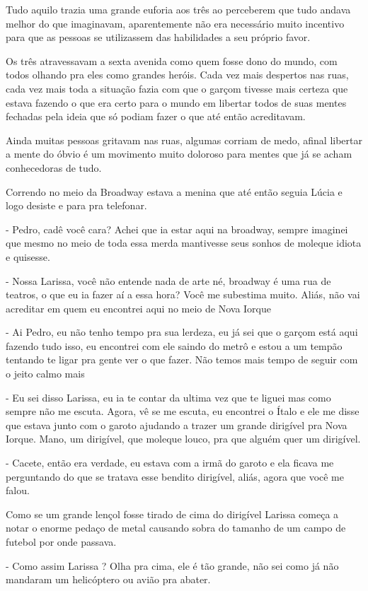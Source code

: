 Tudo aquilo trazia uma grande euforia aos três ao perceberem que tudo andava melhor do que imaginavam, aparentemente não era necessário muito incentivo para que as pessoas se utilizassem das habilidades a seu próprio favor.

Os três atravessavam a sexta avenida como quem fosse dono do mundo,  com todos olhando pra eles como grandes heróis. Cada vez mais despertos nas ruas, cada vez mais toda a situação fazia com que o garçom tivesse mais certeza que estava fazendo o que era certo para o mundo em libertar todos de suas mentes fechadas pela ideia que só podiam fazer o que até então acreditavam.

Ainda muitas pessoas gritavam nas ruas, algumas corriam de medo, afinal libertar a mente do óbvio é um movimento muito doloroso para mentes que já se acham conhecedoras de tudo.

Correndo no meio da Broadway estava a menina que até então seguia Lúcia e logo desiste e para pra telefonar.

- Pedro, cadê você cara? Achei que ia estar aqui na broadway, sempre imaginei que mesmo no meio de toda essa merda mantivesse seus sonhos de moleque idiota e quisesse.

- Nossa Larissa, você não entende nada de arte né, broadway é uma rua de teatros, o que eu ia fazer aí a essa hora? Você me subestima muito. Aliás, não vai acreditar em quem eu encontrei aqui no meio de Nova Iorque

- Ai Pedro, eu não tenho tempo pra sua lerdeza, eu já sei que o garçom está aqui fazendo tudo isso, eu encontrei com ele saindo do metrô e estou a um tempão tentando te ligar pra gente ver o que fazer.  Não temos mais tempo de seguir com o jeito calmo mais

- Eu sei disso Larissa, eu ia te contar da ultima vez que te liguei mas como sempre não me escuta. Agora, vê se me escuta, eu encontrei o Ítalo e ele me disse que estava junto com o garoto ajudando a trazer um grande dirigível pra Nova Iorque. Mano, um dirigível, que moleque louco, pra que alguém quer um dirigível.

- Cacete, então era verdade, eu estava com a irmã do garoto e ela ficava me perguntando do que se tratava esse bendito dirigível, aliás, agora que você me falou.

Como se um grande lençol fosse tirado de cima do dirigível Larissa começa a notar o enorme pedaço de metal causando sobra do tamanho de um campo de futebol por onde passava.

- Como assim Larissa ? Olha pra cima, ele é tão grande, não sei como já não mandaram um helicóptero ou avião pra abater.

